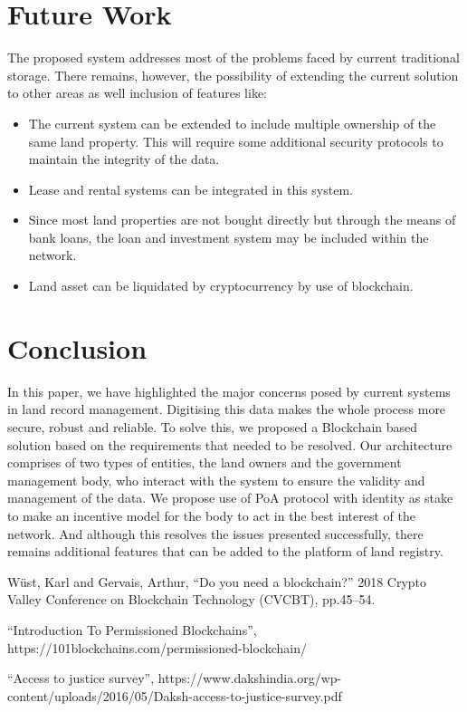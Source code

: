 \documentclass[conference]{IEEEtran}
\begin{document}
\section{Future Work}
The proposed system addresses most of the problems faced by current traditional storage. There remains, however, the possibility of extending the current solution to other areas as well inclusion of features like:
\begin{itemize}
    \item The current system can be extended to include multiple ownership of the same land property. This will require some additional security protocols to maintain the integrity of the data.
    \item Lease and rental systems can be integrated in this system.
    \item Since most land properties are not bought directly but through the means of bank loans, the loan and investment system may be included within the network.
    \item Land asset can be liquidated by cryptocurrency by use of blockchain.
\end{itemize}

\section{Conclusion}
In this paper, we have highlighted the major concerns posed by current systems in land record management. Digitising this data makes the whole process more secure, robust and reliable. To solve this, we proposed a Blockchain based solution based on the requirements that needed to be resolved. Our architecture comprises of two types of entities, the land owners and the government management body, who interact with the system to ensure the validity and management of the data. We propose use of PoA protocol with identity as stake to make an incentive model for the body to act in the best interest of the network. And although this resolves the issues presented successfully, there remains additional features that can be added to the platform of land registry. 

\begin{thebibliography}{00}
 W{\"u}st, Karl and Gervais, Arthur, ``Do you need a blockchain?'' 2018 Crypto Valley Conference on Blockchain Technology (CVCBT), pp.45--54.

 ``Introduction To Permissioned Blockchains'', https://101blockchains.com/permissioned-blockchain/

 ``Access to justice survey'',
https://www.dakshindia.org/wp-content/uploads/2016/05/Daksh-access-to-justice-survey.pdf

\end{thebibliography}
\end{document}
